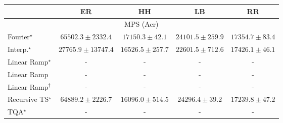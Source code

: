 \begin{tabular}{l|cccc|}
\toprule
            & ER & HH & LB & RR \\
\midrule
\multicolumn{5}{c}{\rule{0pt}{8pt}MPS (Aer)} \\
\midrule
Fourier$^\star$ & {\cellcolor[HTML]{863293}} \color[HTML]{F1F1F1} $65502.3\pm 2332.4$ & {\cellcolor[HTML]{EDF5F9}} \color[HTML]{000000} $17150.3\pm 42.1$ & {\cellcolor[HTML]{D7E5F0}} \color[HTML]{000000} $24101.5\pm 259.9$ & {\cellcolor[HTML]{ECF4F9}} \color[HTML]{000000} $17354.7\pm 83.4$ \\
Interp.$^\star$ & {\cellcolor[HTML]{C8DAEA}} \color[HTML]{000000} $27765.9\pm 13747.4$ & {\cellcolor[HTML]{EEF6FA}} \color[HTML]{000000} $16526.5\pm 257.7$ & {\cellcolor[HTML]{DDEAF3}} \color[HTML]{000000} $22601.5\pm 712.6$ & {\cellcolor[HTML]{ECF4F9}} \color[HTML]{000000} $17426.1\pm 46.1$ \\
Linear Ramp$^\star$ & {\cellcolor[HTML]{000000}} \color[HTML]{F1F1F1} {\cellcolor{white}} \color{black} - & {\cellcolor[HTML]{000000}} \color[HTML]{F1F1F1} {\cellcolor{white}} \color{black} - & {\cellcolor[HTML]{000000}} \color[HTML]{F1F1F1} {\cellcolor{white}} \color{black} - & {\cellcolor[HTML]{000000}} \color[HTML]{F1F1F1} {\cellcolor{white}} \color{black} - \\
Linear Ramp & {\cellcolor[HTML]{000000}} \color[HTML]{F1F1F1} {\cellcolor{white}} \color{black} - & {\cellcolor[HTML]{000000}} \color[HTML]{F1F1F1} {\cellcolor{white}} \color{black} - & {\cellcolor[HTML]{000000}} \color[HTML]{F1F1F1} {\cellcolor{white}} \color{black} - & {\cellcolor[HTML]{000000}} \color[HTML]{F1F1F1} {\cellcolor{white}} \color{black} - \\
Linear Ramp$^\dagger$ & {\cellcolor[HTML]{000000}} \color[HTML]{F1F1F1} {\cellcolor{white}} \color{black} - & {\cellcolor[HTML]{000000}} \color[HTML]{F1F1F1} {\cellcolor{white}} \color{black} - & {\cellcolor[HTML]{000000}} \color[HTML]{F1F1F1} {\cellcolor{white}} \color{black} - & {\cellcolor[HTML]{000000}} \color[HTML]{F1F1F1} {\cellcolor{white}} \color{black} - \\
Recursive TS$^\star$ & {\cellcolor[HTML]{873696}} \color[HTML]{F1F1F1} $64889.2\pm 2226.7$ & {\cellcolor[HTML]{F0F7FA}} \color[HTML]{000000} $16096.0\pm 514.5$ & {\cellcolor[HTML]{D6E4F0}} \color[HTML]{000000} $24296.4\pm 39.2$ & {\cellcolor[HTML]{ECF4F9}} \color[HTML]{000000} $17239.8\pm 47.2$ \\
TQA$^\star$ & {\cellcolor[HTML]{000000}} \color[HTML]{F1F1F1} {\cellcolor{white}} \color{black} - & {\cellcolor[HTML]{000000}} \color[HTML]{F1F1F1} {\cellcolor{white}} \color{black} - & {\cellcolor[HTML]{000000}} \color[HTML]{F1F1F1} {\cellcolor{white}} \color{black} - & {\cellcolor[HTML]{000000}} \color[HTML]{F1F1F1} {\cellcolor{white}} \color{black} - \\

\end{tabular}
